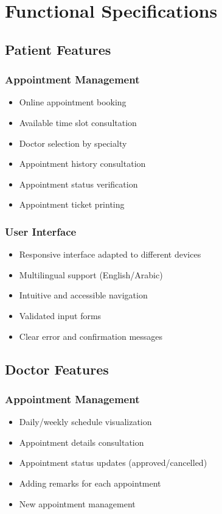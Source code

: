 \documentclass[12pt,a4paper]{report}
\begin{document}
\chapter{Functional Specifications}

\section{Patient Features}

\subsection{Appointment Management}
\begin{itemize}
    \item Online appointment booking
    \item Available time slot consultation
    \item Doctor selection by specialty
    \item Appointment history consultation
    \item Appointment status verification
    \item Appointment ticket printing
\end{itemize}

\subsection{User Interface}
\begin{itemize}
    \item Responsive interface adapted to different devices
    \item Multilingual support (English/Arabic)
    \item Intuitive and accessible navigation
    \item Validated input forms
    \item Clear error and confirmation messages
\end{itemize}

\section{Doctor Features}

\subsection{Appointment Management}
\begin{itemize}
    \item Daily/weekly schedule visualization
    \item Appointment details consultation
    \item Appointment status updates (approved/cancelled)
    \item Adding remarks for each appointment
    \item New appointment management
\end{itemize}
\end{document}
